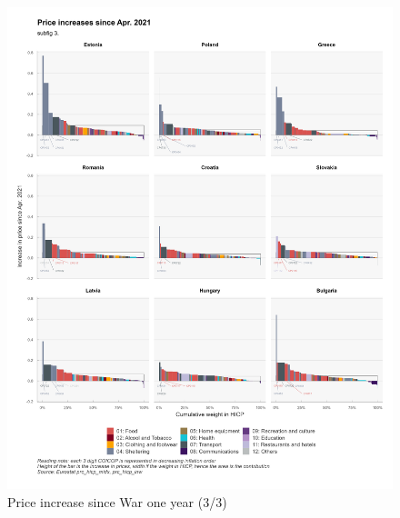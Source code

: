 \documentclass[
  9pt,
  a4paper,
  DIV=11,
  numbers=noendperiod,
  oneside]{scrartcl}
\begin{document}
\begin{figure}

\caption{Price increase since War one year (3/3)}

{\centering \includegraphics[width=17cm,height=\textheight]{../svg/depuis_1y_3.png}

}

\end{figure}
\end{document}
